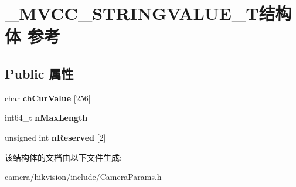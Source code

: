 \hypertarget{struct___m_v_c_c___s_t_r_i_n_g_v_a_l_u_e___t}{}\section{\+\_\+\+M\+V\+C\+C\+\_\+\+S\+T\+R\+I\+N\+G\+V\+A\+L\+U\+E\+\_\+\+T结构体 参考}
\label{struct___m_v_c_c___s_t_r_i_n_g_v_a_l_u_e___t}
\subsection*{Public 属性}
\begin{DoxyCompactItemize}
\item 
\mbox{\label{struct___m_v_c_c___s_t_r_i_n_g_v_a_l_u_e___t_afd471c89b8b96d1d23097cf7ff485d43}} 
char {\bfseries ch\+Cur\+Value} \mbox{[}256\mbox{]}
\item 
\mbox{\label{struct___m_v_c_c___s_t_r_i_n_g_v_a_l_u_e___t_a75c6c71dc428045da06df70183ee80b2}} 
int64\+\_\+t {\bfseries n\+Max\+Length}
\item 
\mbox{\label{struct___m_v_c_c___s_t_r_i_n_g_v_a_l_u_e___t_a9d936104ce16f47ff01c533a0ed1908e}} 
unsigned int {\bfseries n\+Reserved} \mbox{[}2\mbox{]}
\end{DoxyCompactItemize}


该结构体的文档由以下文件生成\+:\begin{DoxyCompactItemize}
\item 
camera/hikvision/include/Camera\+Params.\+h\end{DoxyCompactItemize}
